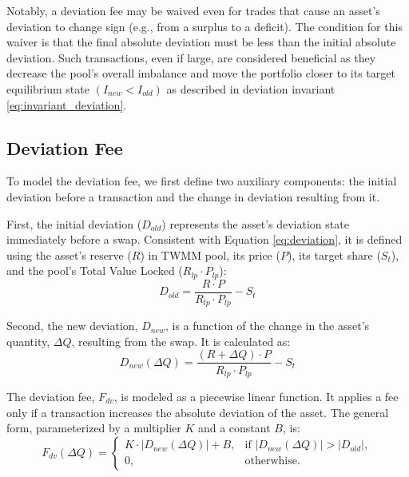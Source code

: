 Notably, a deviation fee may be waived even for trades that cause an asset's deviation to change sign (e.g., from a surplus to a deficit). The condition for this waiver is that the final absolute deviation must be less than the initial absolute deviation. Such transactions, even if large, are considered beneficial as they decrease the pool's overall imbalance and move the portfolio closer to its target equilibrium state $(I_{new} < I_{old})$ as described in deviation invariant \ref{eq:invariant_deviation}.

\subsection{Deviation Fee}
To model the deviation fee, we first define two auxiliary components: the initial deviation before a transaction and the change in deviation resulting from it.

First, the initial deviation ($D_{old}$) represents the asset's deviation state immediately before a swap. Consistent with Equation \ref{eq:deviation}, it is defined using the asset's reserve ($R$) in TWMM pool, its price ($P$), its target share ($S_t$), and the pool's Total Value Locked ($R_{lp} \cdot P_{lp}$):
\begin{equation}
	\label{eq:deviation_old_function_formula}
	D_{old} = \frac{R \cdot P}{R_{lp} \cdot P_{lp}} - S_t
\end{equation}	

Second, the new deviation, $D_{new}$, is a function of the change in the asset's quantity, $\Delta Q$, resulting from the swap. It is calculated as:
\begin{equation}
	\label{eq:deviation_new_function_formula}
	D_{new}(\Delta Q) = \frac{(R + \Delta Q) \cdot P}{R_{lp} \cdot P_{lp}} - S_t
\end{equation}	

The deviation fee, $F_{dv}$, is modeled as a piecewise linear function. It applies a fee only if a transaction increases the absolute deviation of the asset. The general form, parameterized by a multiplier $K$ and a constant $B$, is:
\begin{equation}
	\label{eq:basic_deviation_function}
	F_{dv}(\Delta Q) = \begin{cases} 
		K \cdot \lvert D_{new}(\Delta Q) \rvert + B, & \text{if } \lvert D_{new}(\Delta Q) \rvert > \lvert D_{old} \rvert, \\
		0, & \text{otherwhise.}
	\end{cases}	
\end{equation}

